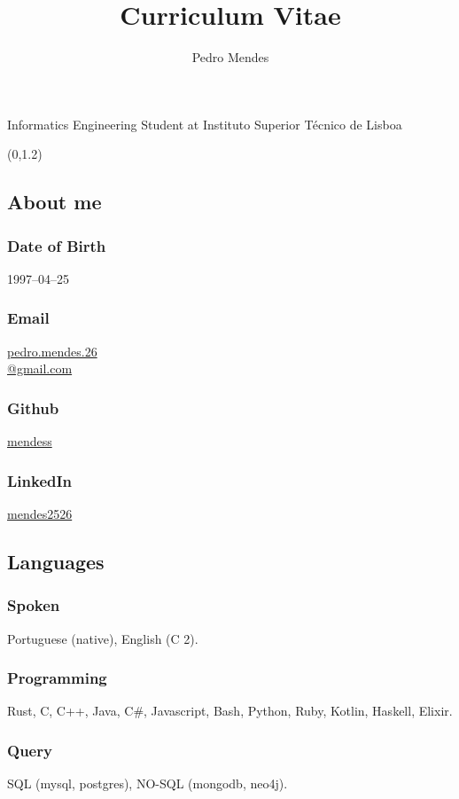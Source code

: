 \documentclass{article}
\renewcommand{\maketitle}{\begin{center}
    {\huge\bfseries\theauthor}

    \vspace{.25em}

    \Large{Informatics Engineering Student at Instituto Superior Técnico de Lisboa}

    \vspace{.25em}

    \large{\thetitle}
\end{center}
}
\begin{document}
\title{Curriculum Vitae}
\author{Pedro Mendes}

\maketitle

\begin{textblock}{2} (0,1.2)
    \begin{flushright}
        \subsection{\hfill About me}
        \subsubsection{\hfill Date of Birth}
        1997--04--25
        \subsubsection{\hfill Email}
        \href{mailto:pedro.mendes.26@gmail.com}{pedro.mendes.26\\@gmail.com}
        \subsubsection{\hfill Github}
        \href{https://github.com/mendess}{mendess}
        \subsubsection{\hfill LinkedIn}
        \href{https://www.linkedin.com/in/mendes2526/}{mendes2526}

        \subsection{\hfill Languages}
        \subsubsection{\hfill Spoken}
        Portuguese (native), English (C 2).
        \subsubsection{\hfill Programming}
        Rust, C, C++, Java, C\#, Javascript, Bash, Python, Ruby, Kotlin,
        Haskell, Elixir.
        \subsubsection{\hfill Query}
        SQL (mysql, postgres), NO-SQL (mongodb, neo4j).

\end{flushright}
\end{textblock}
\end{document}
